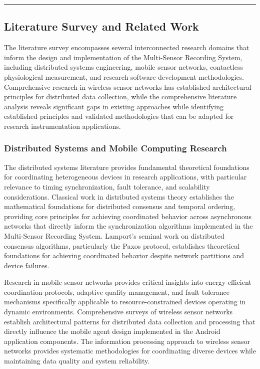 \documentclass[11pt,a4paper]{report}
\begin{document}
\hrule

\subsection{Literature Survey and Related Work}

The literature survey encompasses several interconnected research domains that inform the design and implementation of
the Multi-Sensor Recording System, including distributed systems engineering, mobile sensor networks, contactless
physiological measurement, and research software development methodologies. Comprehensive research in wireless sensor
networks has established architectural principles for distributed data collection, while the comprehensive literature
analysis reveals significant gaps in existing approaches while identifying established principles and validated
methodologies that can be adapted for research instrumentation applications.

\subsubsection{Distributed Systems and Mobile Computing Research}

The distributed systems literature provides fundamental theoretical foundations for coordinating heterogeneous devices
in research applications, with particular relevance to timing synchronization, fault tolerance, and scalability
considerations. Classical work in distributed systems theory establishes the mathematical foundations for distributed
consensus and temporal ordering, providing core principles for achieving coordinated behavior across asynchronous
networks that directly inform the synchronization algorithms implemented in the Multi-Sensor Recording System. Lamport's
seminal work on distributed consensus algorithms, particularly the Paxos protocol, establishes theoretical foundations
for achieving coordinated behavior despite network partitions and device failures.

Research in mobile sensor networks provides critical insights into energy-efficient coordination protocols, adaptive
quality management, and fault tolerance mechanisms specifically applicable to resource-constrained devices operating in
dynamic environments. Comprehensive surveys of wireless sensor networks establish architectural patterns for distributed
data collection and processing that directly influence the mobile agent design implemented in the Android application
components. The information processing approach to wireless sensor networks provides systematic methodologies for
coordinating diverse devices while maintaining data quality and system reliability.
\end{document}
